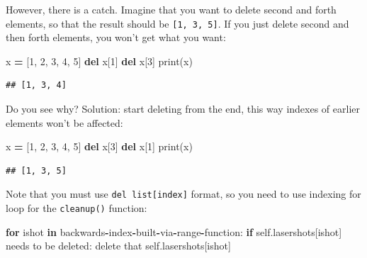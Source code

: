 \documentclass[
]{book}
\newenvironment{Shaded}{\begin{snugshade}}{\end{snugshade}}
\newcommand{\BuiltInTok}[1]{#1}
\newcommand{\ControlFlowTok}[1]{\textcolor[rgb]{0.13,0.29,0.53}{\textbf{#1}}}
\newcommand{\DecValTok}[1]{\textcolor[rgb]{0.00,0.00,0.81}{#1}}
\newcommand{\KeywordTok}[1]{\textcolor[rgb]{0.13,0.29,0.53}{\textbf{#1}}}
\newcommand{\NormalTok}[1]{#1}
\newcommand{\OperatorTok}[1]{\textcolor[rgb]{0.81,0.36,0.00}{\textbf{#1}}}
\newcommand{\VariableTok}[1]{\textcolor[rgb]{0.00,0.00,0.00}{#1}}
\begin{document}
However, there is a catch. Imagine that you want to delete second and forth elements, so that the result should be \texttt{{[}1,\ 3,\ 5{]}}. If you just delete second and then forth elements, you won't get what you want:

\begin{Shaded}
\begin{Highlighting}[]
\NormalTok{x }\OperatorTok{=}\NormalTok{ [}\DecValTok{1}\NormalTok{, }\DecValTok{2}\NormalTok{, }\DecValTok{3}\NormalTok{, }\DecValTok{4}\NormalTok{, }\DecValTok{5}\NormalTok{]}
\KeywordTok{del}\NormalTok{ x[}\DecValTok{1}\NormalTok{]}
\KeywordTok{del}\NormalTok{ x[}\DecValTok{3}\NormalTok{]}
\BuiltInTok{print}\NormalTok{(x)}
\end{Highlighting}
\end{Shaded}

\begin{verbatim}
## [1, 3, 4]
\end{verbatim}

Do you see why? Solution: start deleting from the end, this way indexes of earlier elements won't be affected:

\begin{Shaded}
\begin{Highlighting}[]
\NormalTok{x }\OperatorTok{=}\NormalTok{ [}\DecValTok{1}\NormalTok{, }\DecValTok{2}\NormalTok{, }\DecValTok{3}\NormalTok{, }\DecValTok{4}\NormalTok{, }\DecValTok{5}\NormalTok{]}
\KeywordTok{del}\NormalTok{ x[}\DecValTok{3}\NormalTok{]}
\KeywordTok{del}\NormalTok{ x[}\DecValTok{1}\NormalTok{]}
\BuiltInTok{print}\NormalTok{(x)}
\end{Highlighting}
\end{Shaded}

\begin{verbatim}
## [1, 3, 5]
\end{verbatim}

Note that you must use \texttt{del\ list{[}index{]}} format, so you need to use indexing for loop for the \texttt{cleanup()} function:

\begin{Shaded}
\begin{Highlighting}[]
\ControlFlowTok{for}\NormalTok{ ishot }\KeywordTok{in}\NormalTok{ backwards}\OperatorTok{{-}}\NormalTok{index}\OperatorTok{{-}}\NormalTok{built}\OperatorTok{{-}}\NormalTok{via}\OperatorTok{{-}}\BuiltInTok{range}\OperatorTok{{-}}\NormalTok{function:}
  \ControlFlowTok{if} \VariableTok{self}\NormalTok{.lasershots[ishot] needs to be deleted:}
\NormalTok{    delete that }\VariableTok{self}\NormalTok{.lasershots[ishot]}
\end{Highlighting}
\end{Shaded}
\end{document}
